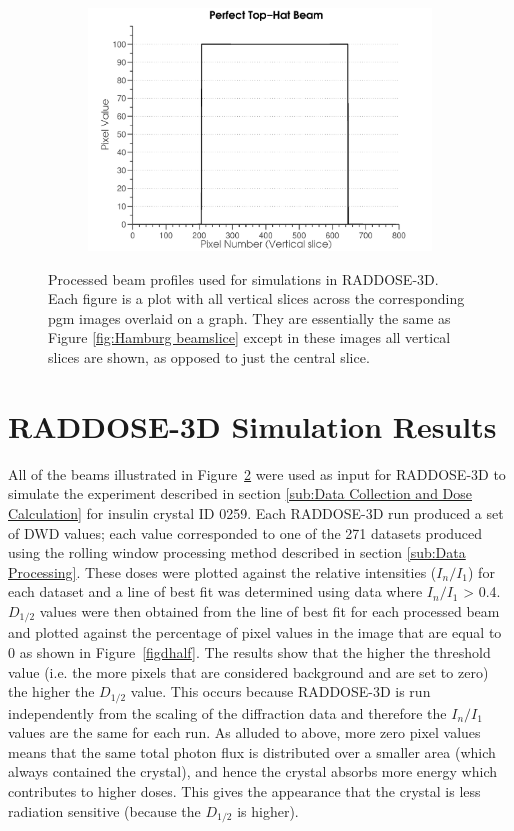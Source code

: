 \begin{figure}
\begin{subfigure}[b]{0.45\textwidth}
                \centering
                \includegraphics[width=\textwidth]{figures/beam/fig_beam_ideal.pdf}
                \caption{}
                \label{figallbeams9}
        \end{subfigure}
        \caption[Processed beam profiles used for simulations in RADDOSE-3D.]{Processed beam profiles used for simulations in RADDOSE-3D.
        Each figure is a plot with all vertical slices across the corresponding pgm images overlaid on a graph.
        They are essentially the same as Figure \ref{fig:Hamburg beamslice} except in these images all vertical slices are shown, as opposed to just the central slice.}
        \label{figallbeamscont}
\end{figure}

\section{RADDOSE-3D Simulation Results}
All of the beams illustrated in Figure~\ref{figallbeamscont} were used as input for RADDOSE-3D to simulate the experiment described in section \ref{sub:Data Collection and Dose Calculation} for insulin crystal ID 0259.
Each RADDOSE-3D run produced a set of DWD values; each value corresponded to one of the 271 datasets produced using the rolling window processing method described in section \ref{sub:Data Processing}.
These doses were plotted against the relative intensities ($I_n / I_1$) for each dataset and a line of best fit was determined using data where $I_n / I_1$ > 0.4.
$D_{1/2}$ values were then obtained from the line of best fit for each processed beam and plotted against the percentage of pixel values in the image that are equal to 0 as shown in Figure~\ref{figdhalf}.
The results show that the higher the threshold value (i.e. the more pixels that are considered background and are set to zero) the higher the $D_{1/2}$ value.
This occurs because RADDOSE-3D is run independently from the scaling of the diffraction data and therefore the $I_n/I_1$ values are the same for each run.
As alluded to above, more zero pixel values means that the same total photon flux is distributed over a smaller area (which always contained the crystal), and hence the crystal absorbs more energy which contributes to higher doses.
This gives the appearance that the crystal is less radiation sensitive (because the $D_{1/2}$ is higher).

